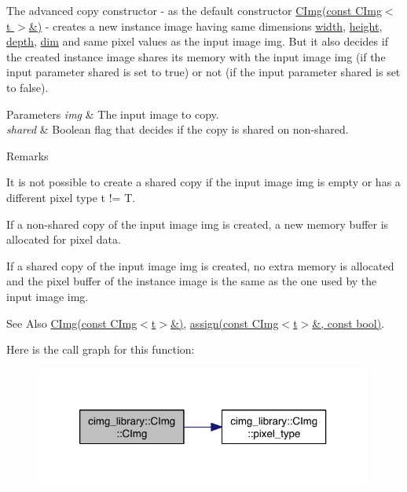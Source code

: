 The advanced copy constructor -\/ as the default constructor \hyperlink{structcimg__library_1_1_c_img_a77871bed283c449b2e9ed5624811c68e}{C\-Img(const C\-Img$<$ t $>$\&)} -\/ creates a new instance image having same dimensions \hyperlink{structcimg__library_1_1_c_img_a5fb74a7776210bb99fd6755319ade13f}{width}, \hyperlink{structcimg__library_1_1_c_img_a30d575fd18ae525e507315de71b4806a}{height}, \hyperlink{structcimg__library_1_1_c_img_a982d5d1e153477adf7f851106fe8ee3a}{depth}, \hyperlink{structcimg__library_1_1_c_img_ac9648dfe0a26d58e6e0030a3dbca234e}{dim} and same pixel values as the input image {\ttfamily img}. But it also decides if the created instance image shares its memory with the input image {\ttfamily img} (if the input parameter {\ttfamily shared} is set to {\ttfamily true}) or not (if the input parameter {\ttfamily shared} is set to {\ttfamily false}). 
\begin{DoxyParams}{Parameters}
{\em img} & The input image to copy. \\
\hline
{\em shared} & Boolean flag that decides if the copy is shared on non-\/shared. \\
\hline
\end{DoxyParams}
\begin{DoxyRemark}{Remarks}

\begin{DoxyItemize}
\item It is not possible to create a shared copy if the input image {\ttfamily img} is empty or has a different pixel type {\ttfamily t} != {\ttfamily T}.
\item If a non-\/shared copy of the input image {\ttfamily img} is created, a new memory buffer is allocated for pixel data.
\item If a shared copy of the input image {\ttfamily img} is created, no extra memory is allocated and the pixel buffer of the instance image is the same as the one used by the input image {\ttfamily img}. 
\end{DoxyItemize}
\end{DoxyRemark}
\begin{DoxySeeAlso}{See Also}
\hyperlink{structcimg__library_1_1_c_img_a77871bed283c449b2e9ed5624811c68e}{C\-Img(const C\-Img$<$t$>$\&)}, \hyperlink{structcimg__library_1_1_c_img_acb24b21aeca1398549a3b11ec6bfa8d1}{assign(const C\-Img$<$t$>$\&, const bool)}. 
\end{DoxySeeAlso}


Here is the call graph for this function\-:
\nopagebreak
\begin{figure}[H]
\begin{center}
\leavevmode
\includegraphics[width=316pt]{structcimg__library_1_1_c_img_ab2bc3f0c5730c1f57dfb8b920954444f_cgraph}
\end{center}
\end{figure}


